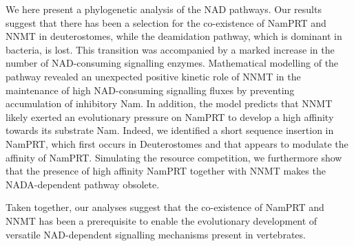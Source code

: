 We here present a phylogenetic analysis of the NAD pathways. Our results suggest that there has been a selection for the co-existence of NamPRT and NNMT in deuterostomes, while the deamidation pathway, which is dominant in bacteria, is lost. This transition was accompanied by a marked increase in the number of NAD-consuming signalling enzymes. Mathematical modelling of the pathway revealed an unexpected positive kinetic role of NNMT in the maintenance of high NAD-consuming signalling fluxes by preventing accumulation of inhibitory Nam. In addition, the model predicts that NNMT likely exerted an evolutionary pressure on NamPRT to develop a high affinity towards its substrate Nam. Indeed, we identified a short sequence insertion in NamPRT, which first occurs in Deuterostomes and that appears to modulate the affinity of NamPRT. Simulating the resource competition, we furthermore show that the presence of high affinity NamPRT together with NNMT makes the NADA-dependent pathway obsolete.

Taken together, our analyses suggest that the co-existence of NamPRT and NNMT has been a prerequisite to enable the evolutionary development of versatile NAD-dependent signalling mechanisms present in vertebrates.
